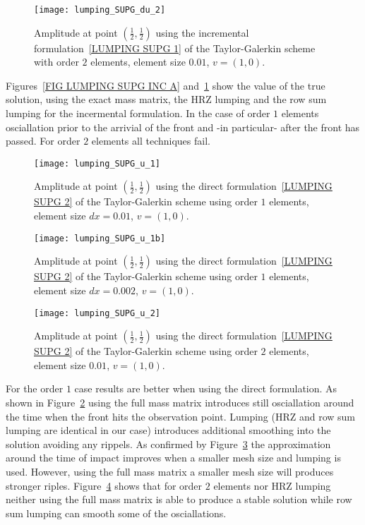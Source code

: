 \begin{figure}
\centerline{\texttt{[image: lumping\_SUPG\_du\_2]}}
\caption{Amplitude at point $(\frac{1}{2},\frac{1}{2})$ using the incremental formulation~\ref{LUMPING SUPG 1} of the 
Taylor-Galerkin scheme  with order $2$ elements, element size $0.01$, $v=(1,0)$.}
\label{FIG LUMPING SUPG INC B}
\end{figure}

Figures~\ref{FIG LUMPING SUPG INC A} and~\ref{FIG LUMPING SUPG INC B} show the value of the true solution,
using the exact mass matrix, the HRZ lumping and the row sum lumping for the incermental formulation. In the case of order $1$ elements
osciallation prior to the arrivial of the front and -in particular- after the front has passed. 
For order $2$ elements all techniques fail. 

\begin{figure}
\centerline{\texttt{[image: lumping\_SUPG\_u\_1]}}
\caption{Amplitude at point $(\frac{1}{2},\frac{1}{2})$ using the direct formulation~\ref{LUMPING SUPG 2} of the 
Taylor-Galerkin scheme using order $1$ elements, element size $dx=0.01$, $v=(1,0)$.}
\label{FIG LUMPING SUPG A}
\end{figure}
\begin{figure}
\centerline{\texttt{[image: lumping\_SUPG\_u\_1b]}}
\caption{Amplitude at point $(\frac{1}{2},\frac{1}{2})$ using the direct formulation~\ref{LUMPING SUPG 2} of the 
Taylor-Galerkin scheme using order $1$ elements, element size $dx=0.002$, $v=(1,0)$.}
\label{FIG LUMPING SUPG Ab}
\end{figure}

\begin{figure}
\centerline{\texttt{[image: lumping\_SUPG\_u\_2]}}
\caption{Amplitude at point $(\frac{1}{2},\frac{1}{2})$ using the direct formulation~\ref{LUMPING SUPG 2} of the 
Taylor-Galerkin scheme  using order $2$ elements, element size $0.01$, $v=(1,0)$.}
\label{FIG LUMPING SUPG B}
\end{figure}

For the order $1$ case results are better when using the direct formulation. As shown in Figure~\ref{FIG LUMPING SUPG A}
using the full mass matrix introduces still osciallation around the time when the front hits the
observation point. Lumping (HRZ and row sum lumping are identical in our case) introduces additional 
smoothing into the solution avoiding any rippels. As confirmed by Figure~\ref{FIG LUMPING SUPG Ab}
the approximation around the time of impact improves when a smaller mesh size and lumping is used.
However, using the full mass matrix a smaller mesh size will produces stronger riples.
Figure~\ref{FIG LUMPING SUPG B} shows that
for order $2$ elements nor HRZ lumping neither using the full mass matrix is able to produce a stable solution
while row sum lumping can smooth some of the osciallations.   


